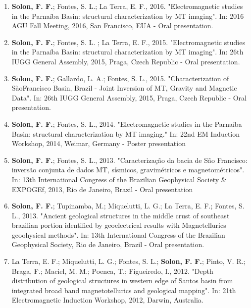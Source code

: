 \documentclass[10pt,a4paper,sans]{moderncv} %
\begin{document}
\begin{enumerate}

\item \textbf{Solon, F. F.}; Fontes, S. L.; La Terra, E. F., 2016. "Electromagnetic studies in the Parna\'{i}ba Basin: structural characterization by MT imaging". In: 2016 AGU Fall Meeting, 2016, San Francisco, EUA - Oral presentation.\\

\item \textbf{Solon, F. F.}; Fontes, S. L. ; La Terra, E. F., 2015. "Electromagnetic studies in the Parna\'{i}ba Basin: structural characterization by MT imaging". In: 26th IUGG General Assembly, 2015, Praga, Czech Republic - Oral presentation.\\

\item \textbf{Solon, F. F.}; Gallardo, L. A.; Fontes, S. L., 2015. "Characterization of S\`{a}oFrancisco Basin, Brazil - Joint Inversion of MT, Gravity and Magnetic Data". In: 26th IUGG General Assembly, 2015, Praga, Czech Republic - Oral presentation. \\

\item \textbf{Solon, F. F.}; Fontes, S. L., 2014. "Electromagnetic studies in the Parna\'{i}ba Basin: structural characterization by MT imaging." In: 22nd EM Induction Workshop, 2014, Weimar, Germany - Poster presentation\\

\item \textbf{Solon, F. F.}; Fontes, S. L., 2013. "Caracteriza\c{c}\~{a}o da bacia de S\~{a}o Francisco: invers\~{a}o conjunta de dados MT, s\'{i}smicos, gravim\'{e}tricos e magnetom\'{e}tricos". In: 13th International Congress of the Brazilian Geophysical Society & EXPOGEf, 2013, Rio de Janeiro, Brazil - Oral presentation\\

\item \textbf{Solon, F. F.}; Tupinamba, M.; Miquelutti, L. G.; La Terra, E. F.; Fontes, S. L., 2013. "Ancient geological structures in the middle crust of southeast brazilian portion identified by geoelectrical results with Magnetellurics geoohysical methods". In: 13th International Congress of the Brazilian Geophysical Society, Rio de Janeiro, Brazil - Oral presentation.\\

\item La Terra, E. F.; Miquelutti, L. G.; Fontes, S. L.; \textbf{Solon, F. F.}; Pinto, V. R.; Braga, F.; Maciel, M. M.; Poenca, T.; Figueiredo, I., 2012. "Depth distribution of geological structures in western edge of Santos basin from integrated broad band magnetotellurics and geological mapping". In: 21th Electromagnetic Induction Workshop, 2012, Darwin, Australia.\\


\end{enumerate}
\end{document}
